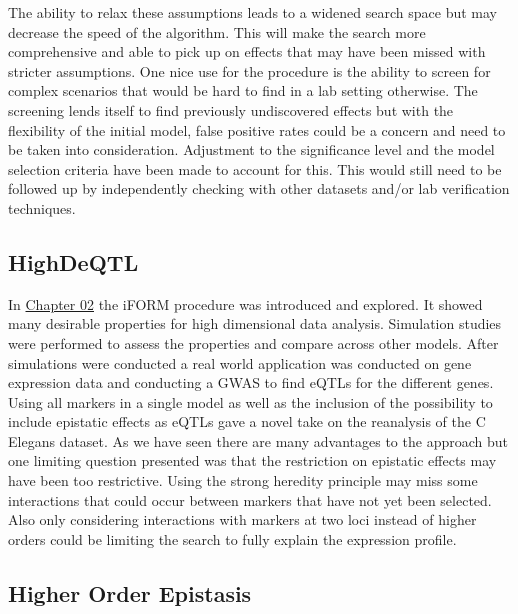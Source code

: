 \documentclass[11pt,]{book}
\theoremstyle{definition}
\theoremstyle{definition}
\theoremstyle{remark}
\begin{document}
The ability to relax these assumptions leads to a widened search space
but may decrease the speed of the algorithm. This will make the search
more comprehensive and able to pick up on effects that may have been
missed with stricter assumptions. One nice use for the procedure is the
ability to screen for complex scenarios that would be hard to find in a
lab setting otherwise. The screening lends itself to find previously
undiscovered effects but with the flexibility of the initial model,
false positive rates could be a concern and need to be taken into
consideration. Adjustment to the significance level and the model
selection criteria have been made to account for this. This would still
need to be followed up by independently checking with other datasets
and/or lab verification techniques.

\subsection{HighDeQTL}\label{highdeqtl-1}

In \protect\hyperlink{highdeqtl}{Chapter 02} the iFORM procedure was
introduced and explored. It showed many desirable properties for high
dimensional data analysis. Simulation studies were performed to assess
the properties and compare across other models. After simulations were
conducted a real world application was conducted on gene expression data
and conducting a GWAS to find eQTLs for the different genes. Using all
markers in a single model as well as the inclusion of the possibility to
include epistatic effects as eQTLs gave a novel take on the reanalysis
of the C Elegans dataset. As we have seen there are many advantages to
the approach but one limiting question presented was that the
restriction on epistatic effects may have been too restrictive. Using
the strong heredity principle may miss some interactions that could
occur between markers that have not yet been selected. Also only
considering interactions with markers at two loci instead of higher
orders could be limiting the search to fully explain the expression
profile.

\subsection{Higher Order Epistasis}\label{higher-order-epistasis-1}
\end{document}
